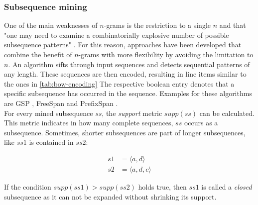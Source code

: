 \subsubsection*{Subsequence mining}
One of the main weaknesses of $n$-grams is the restriction to a single $n$ and that "one may need to examine a combinatorially explosive
number of possible subsequence patterns" \cite{pei2001prefixspan}. For this reason, approaches have been developed that combine the benefit of $n$-grams with more flexibility by avoiding the limitation to $n$. An algorithm sifts through input sequences and detects sequential patterns of any length. These sequences are then encoded, resulting in line items similar to the ones in \autoref{tab:bow-encoding} The respective boolean entry denotes that a specific subsequence has occurred in the sequence.
Examples for these algorithms are GSP \cite{srikant1996gsp}, FreeSpan \cite{han2000freespan} and PrefixSpan \cite{pei2001prefixspan}.\\

For every mined subsequence $ss$, the \textit{support} metric $supp(ss)$ can be calculated. This metric indicates in how many complete sequences, $ss$ occurs as a subsequence. Sometimes, shorter subsequences are part of longer subsequences, like $ss1$ is contained in $ss2$:

\begin{equation*}
\begin{split}
s1 &= \langle a,d \rangle\\
s2 &= \langle a,d,c \rangle
\end{split}
\end{equation*}

If the condition $supp(ss1) > supp(ss2)$ holds true, then $ss1$ is called a \textit{closed} subsequence as it can not be expanded without shrinking its support.
